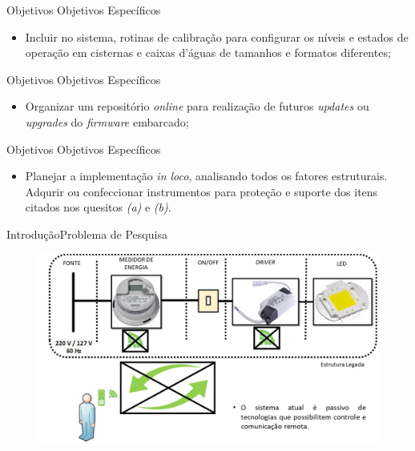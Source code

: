 \begin{frame}{Objetivos}
	{Objetivos Específicos}
	\begin{itemize}
		\item Incluir no sistema, rotinas de calibração para configurar os níveis e estados de operação em cisternas e caixas d'águas de tamanhos e formatos diferentes;
	\end{itemize}
\end{frame}

\begin{frame}{Objetivos}
	{Objetivos Específicos}
	\begin{itemize}
		\item Organizar um repositório \textit{online} para realização de futuros \textit{updates} ou \textit{upgrades} do \textit{firmware} embarcado;
	\end{itemize}
\end{frame}


\begin{frame}{Objetivos}
	{Objetivos Específicos}
	\begin{itemize}
		\item Planejar a implementação \textit{in loco},  analisando todos os fatores estruturais. Adqurir ou confeccionar instrumentos para proteção e suporte dos itens citados nos quesitos \textit{(a)} e \textit{(b)}.
	\end{itemize}
\end{frame}






\begin{frame}{Introdução}{Problema de Pesquisa}
	\vspace{-0.64cm}
	\begin{figure}[htp]
		\centering
		\caption{}
		\includegraphics[width=0.97\linewidth]{img/1.jpg}
		\hspace{5cm}
		\vspace{5cm}
	\end{figure}
	
\end{frame}

